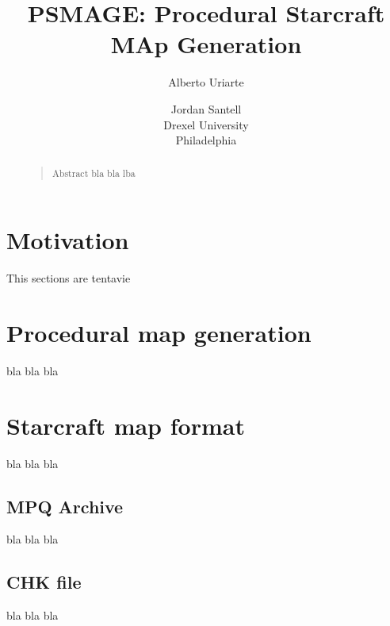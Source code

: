 \documentclass[letterpaper]{article}
\begin{document}
%
\title{PSMAGE: Procedural Starcraft MAp Generation}
\author{Alberto Uriarte \and Jordan Santell\\
Drexel University\\
Philadelphia\\
}
\maketitle
\begin{abstract}
\begin{quote}
Abstract bla bla lba
\end{quote}
\end{abstract}

\section{Motivation}
This sections are tentavie

\section{Procedural map generation}
bla bla bla

\section{Starcraft map format}
bla bla bla

\subsection{MPQ Archive}
bla bla bla

\subsection{CHK file}
bla bla bla


% 
% 
\end{document}

